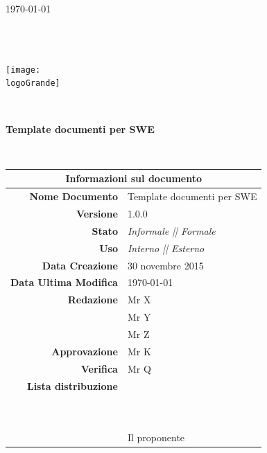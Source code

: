 \documentclass[12pt,a4paper]{article}
\title{\titoloDocumento}
\newcommand{\titoloDocumento}{Template documenti per SWE}
\newcommand{\dataCreazione}{30 novembre 2015}
\newcommand{\versione}{1.0.0}
\newcommand{\stato}{Informale || Formale}
\newcommand{\uso}{Interno || Esterno}
\begin{document}
\begin{titlepage}
\begin{center}
\today \\
\vspace{1cm}
\begin{Huge}
\textbf{\nomeTeam} \\
\end{Huge}
\textbf{\CapitolatoL} \\
\vspace{1cm}
\texttt{[image: \\logoGrande]}
\vspace{1cm}

\HRule \\[0.4cm]
\begin{Huge}
{\huge \bfseries \titoloDocumento}\\[0.4cm]
\end{Huge}
\HRule \\[1cm]
\vfill

\begin{table}[h]
\begin{center}
\begin{tabular}{r | l}
\multicolumn{2}{c}{\textbf{Informazioni sul documento}}\\
\midrule
\textbf{Nome Documento}	&	\titoloDocumento	\\
\textbf{Versione}	&	\versione	\\
\textbf{Stato}	&	\emph{\stato}	\\
\textbf{Uso}	&	\emph{\uso}	\\
\textbf{Data Creazione}	&	\dataCreazione	\\
\textbf{Data Ultima Modifica}	&	\today	\\
\textbf{Redazione}	&	Mr X	\\
\ 	&	Mr Y	\\
\ 	&	Mr Z	\\
\textbf{Approvazione}	&	Mr K	\\
\textbf{Verifica}	&	Mr Q	\\
\textbf{Lista distribuzione}	&	\nomeTeam	\\
\ 	&	\Vardanega	\\
\ 	&	\Cardin	\\
\ 	&	Il proponente \Zucchetti	\\

\end{tabular}
\end{center}
\end{table}

\end{center}
\end{titlepage}
\newpage
\end{document}
